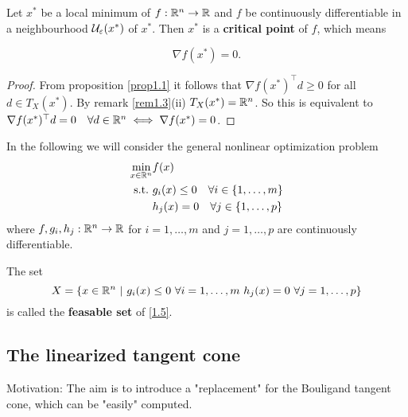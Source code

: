 \begin{theorem}\label{thm1.4}
    Let \(x^*\) be a local minimum of \(f : \mathbb{R}^n \to \mathbb{R}\) and \(f\) be continuously differentiable in a neighbourhood \(\mathcal{U}_\varepsilon(x^*)\) of \(x^*\). Then \(x^*\) is a \textbf{critical point} of \(f\), which means

    \begin{equation}
        \nabla f(x^*) = 0.
    \end{equation}
\end{theorem}
\begin{proof}
    From proposition \ref{prop1.1} it follows that \(\nabla f(x^*)^\top d \ge 0\) for all \(d \in T_X(x^*)\). By remark \ref{rem1.3}(ii) \(T_X(x^*) = \mathbb{R}^n\). So this is equivalent to \(\nabla f(x^*)^\top d = 0 \quad \forall
    d \in \mathbb{R}^n \iff \nabla f(x^*) = 0\).
\end{proof}

In the following we will consider the general nonlinear optimization problem
\begin{equation}\label{1.5}
    \begin{split}
        \min_{x \in \mathbb{R}^n} & f(x) \\
        \mathrm{s.t.} \ & g_i(x) \le 0 \quad \forall i \in \{1, \dots, m\} \\
        & h_j(x) = 0 \quad \forall j \in \{1, \dots, p\}
    \end{split}
\end{equation}
where \(f, g_i, h_j : \mathbb{R}^n \to \mathbb{R}\) for \(i = 1, \dots, m\) and \(j = 1, \dots, p\) are continuously differentiable.

The set
\begin{equation}\label{1.6}
    X = \{ x \in \R^n \ | \ g_i(x) \le 0 \ \forall i = 1,\dots,m \ h_j(x) = 0 \ \forall j = 1,\dots,p\}
\end{equation}
is called the \textbf{feasable set} of \eqref{1.5}.


\subsection{The linearized tangent cone}

Motivation: The aim is to introduce a "replacement" for the Bouligand tangent cone, which can be "easily" computed.

